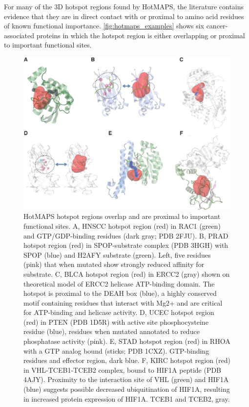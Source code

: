For many of the 3D hotspot regions found by HotMAPS, the literature contains evidence that they are in direct contact with or proximal to amino acid residues of known functional importance. \autoref{fig:hotmaps_examples} shows six cancer-associated proteins in which the hotspot region is either overlapping or proximal to important functional sites.

\begin{figure}
  \centering
  \makeatletter
  \let\@currsize\normalsize
  \includegraphics[width=0.9\linewidth]{figures/chapter5/hotmaps_examples.jpg}
  \caption[HotMAPS hotspot regions overlap and are proximal to important functional sites.]{HotMAPS hotspot regions overlap and are proximal to important functional sites. A, HNSCC hotspot region (red) in RAC1 (green) and GTP/GDP-binding residues (dark gray; PDB 2FJU). B, PRAD hotspot region (red) in SPOP-substrate complex (PDB 3HGH) with SPOP (blue) and H2AFY substrate (green). Left, five residues (pink) that when mutated show strongly reduced affinity for substrate. C, BLCA hotspot region (red) in ERCC2 (gray) shown on theoretical model of ERCC2 helicase ATP-binding domain. The hotspot is proximal to the DEAH box (blue), a highly conserved motif containing residues that interact with Mg2+ and are critical for ATP-binding and helicase activity. D, UCEC hotspot region (red) in PTEN (PDB 1D5R) with active site phosphocysteine residue (blue), residues when mutated annotated to reduce phosphatase activity (pink). E, STAD hotspot region (red) in RHOA with a GTP analog bound (sticks; PDB 1CXZ). GTP-binding residues and effector region, dark blue. F, KIRC hotspot region (red) in VHL-TCEB1-TCEB2 complex, bound to HIF1A peptide (PDB 4AJY). Proximity to the interaction site of VHL (green) and HIF1A (blue) suggests possible decreased ubiquitination of HIF1A, resulting in increased protein expression of HIF1A. TCEB1 and TCEB2, gray.}
  \label{fig:hotmaps_examples}
\end{figure}


